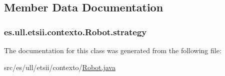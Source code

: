 \subsection{Member Data Documentation}
\hypertarget{classes_1_1ull_1_1etsii_1_1contexto_1_1_robot_aebafde0ad8d25d829a8ce4f8287c262f}{
\subsubsection[{strategy}]{ es.\-ull.\-etsii.\-contexto.\-Robot.\-strategy\hspace{0.3cm}{\ttfamily [private]}}}\label{classes_1_1ull_1_1etsii_1_1contexto_1_1_robot_aebafde0ad8d25d829a8ce4f8287c262f}


The documentation for this class was generated from the following file\-:\begin{DoxyCompactItemize}
\item 
src/es/ull/etsii/contexto/\hyperlink{_robot_8java}{Robot.\-java}\end{DoxyCompactItemize}

